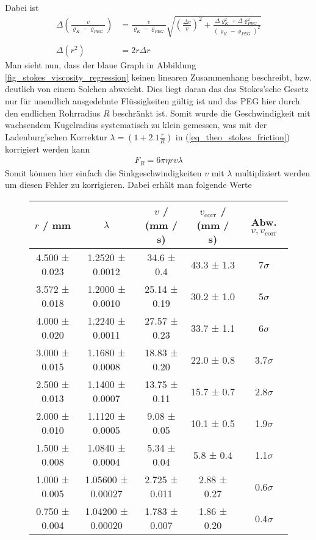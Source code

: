 \documentclass[12pt,a4paper,german]{scrartcl}
\numberwithin{equation}{section}
\begin{document}
  Dabei ist
  \begin{align}
    \Delta \left(\frac{v}{\varrho_K - \varrho_{PEG}} \right) &= \frac{v}{\varrho_K - \varrho_{PEG}} \sqrt{\left(\frac{\Delta v}{v} \right)^2 + \frac{\Delta \varrho_K^2 + \Delta \varrho_{PEG}^2}{(\varrho_K - \varrho_{PEG})^2}} \nonumber \\
    \nonumber \\
    \Delta (r^2) &= 2 r \Delta r
  \end{align}
  Man sieht nun, dass der blaue Graph in Abbildung \ref{fig_stokes_viscosity_regression} keinen linearen Zusammenhang beschreibt, bzw. deutlich von einem Solchen abweicht.
  Dies liegt daran das das Stokes'sche Gesetz nur für unendlich ausgedehnte Flüssigkeiten gültig ist und das PEG hier durch den endlichen Rohrradius $R$ beschränkt ist.
  Somit wurde die Geschwindigkeit mit wachsendem Kugelradius systematisch zu klein gemessen, was mit der Ladenburg'schen Korrektur $\lambda = \left(1 + 2.1 \frac{r}{R}\right)$ in (\ref{eq_theo_stokes_friction}) korrigiert werden kann
  \begin{align}
    F_R = 6 \pi \eta r v \lambda
  \end{align}
  Somit können hier einfach die Sinkgeschwindigkeiten $v$ mit $\lambda$ multipliziert werden um diesen Fehler zu korrigieren.
  Dabei erhält man folgende Werte
  
  \begin{figure}[h]
    \centering
    \begin{tabular}{c|c|c|c|c}
      $r$ / mm & $\lambda$ & $v$ / (mm / s) & $v_\text{corr}$ / (mm / s) & Abw. $v, v_\text{corr}$ \\
      \hline
      4.500 ± 0.023 &  1.2520 ± 0.0012  &  34.6 ± 0.4   &   43.3 ± 1.3    &     7$\sigma$ \\
      3.572 ± 0.018 &  1.2000 ± 0.0010  & 25.14 ± 0.19  &   30.2 ± 1.0    &     5$\sigma$ \\
      4.000 ± 0.020 &  1.2240 ± 0.0011  & 27.57 ± 0.23  &   33.7 ± 1.1    &     6$\sigma$ \\
      3.000 ± 0.015 &  1.1680 ± 0.0008  & 18.83 ± 0.20  &   22.0 ± 0.8    &   3.7$\sigma$ \\
      2.500 ± 0.013 &  1.1400 ± 0.0007  & 13.75 ± 0.11  &   15.7 ± 0.7    &   2.8$\sigma$ \\
      2.000 ± 0.010 &  1.1120 ± 0.0005  &  9.08 ± 0.05  &   10.1 ± 0.5    &   1.9$\sigma$ \\
      1.500 ± 0.008 &  1.0840 ± 0.0004  &  5.34 ± 0.04  &    5.8 ± 0.4    &   1.1$\sigma$ \\
      1.000 ± 0.005 & 1.05600 ± 0.00027 & 2.725 ± 0.011 &   2.88 ± 0.27   &   0.6$\sigma$ \\
      0.750 ± 0.004 & 1.04200 ± 0.00020 & 1.783 ± 0.007 &   1.86 ± 0.20   &   0.4$\sigma$
    \end{tabular}
    \label{table_v_correction}
  \end{figure}
  
\end{document}
